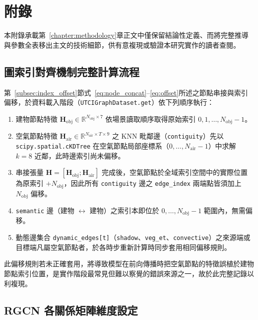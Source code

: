 \chapter{附錄}

本附錄承載第~\ref{chapter:methodology}章正文中僅保留結論性定義、而將完整推導與參數全表移出主文的技術細節，供有意複現或驗證本研究實作的讀者查閱。

\section{圖索引對齊機制完整計算流程}
\label{appx:index_offset_detail}

第~\ref{subsec:index_offset}節式~\eqref{eq:node_concat}--\eqref{eq:offset}所述之節點串接與索引偏移，於資料載入階段（\texttt{UTCIGraphDataset.get}）依下列順序執行：

\begin{enumerate}
    \item 建物節點特徵 $\mathbf{H}_{\text{obj}} \in \mathbb{R}^{N_{\text{obj}} \times 7}$ 依場景讀取順序取得原始索引 $0, 1, \ldots, N_{\text{obj}}-1$。
    \item 空氣節點特徵 $\mathbf{H}_{\text{air}} \in \mathbb{R}^{N_{\text{air}} \times T \times 9}$ 之 KNN 毗鄰邊（\texttt{contiguity}）先以 \texttt{scipy.spatial.cKDTree} 在空氣節點局部座標系（$0, \ldots, N_{\text{air}}-1$）中求解 $k=8$ 近鄰，此時邊索引尚未偏移。
    \item 串接張量 $\mathbf{H} = [\mathbf{H}_{\text{obj}}; \mathbf{H}_{\text{air}}]$ 完成後，空氣節點於全域索引空間中的實際位置為原索引 $+N_{\text{obj}}$，因此所有 \texttt{contiguity} 邊之 \texttt{edge\_index} 兩端點皆須加上 $N_{\text{obj}}$ 偏移。
    \item \texttt{semantic} 邊（建物 $\leftrightarrow$ 建物）之索引本即位於 $0, \ldots, N_{\text{obj}}-1$ 範圍內，無需偏移。
    \item 動態邊集合 \texttt{dynamic\_edges[t]}（\texttt{shadow}、\texttt{veg\_et}、\texttt{convective}）之來源端或目標端凡屬空氣節點者，於各時步重新計算時同步套用相同偏移規則。
\end{enumerate}

此偏移規則若未正確套用，將導致模型在前向傳播時把空氣節點的特徵誤植於建物節點索引位置，是實作階段最常見但難以察覺的錯誤來源之一，故於此完整記錄以利複現。


\section{RGCN 各關係矩陣維度設定}
\label{appx:rgcn_detail}

